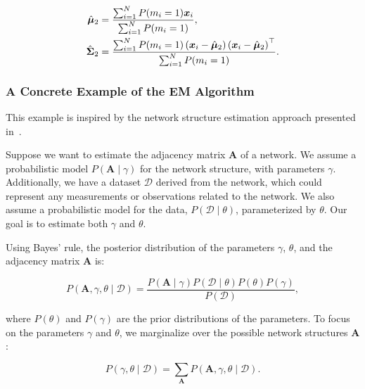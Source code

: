 {\begin{itemize}
    \begin{equation}
        \begin{aligned}
            \hat{\bm{\mu}}_2 & = \frac{\sum_{i=1}^{N}{P(m_i=1) \bm{x}_i}}{\sum_{i=1}^{N}{P(m_i=1)}},  \\
            \hat{\bm{\Sigma}}_2 & = \frac{\sum_{i=1}^{N}{P(m_i=1)\left( \bm{x}_i -  \hat{\bm{\mu}}_2  \right)\left( \bm{x}_i -  \hat{\bm{\mu}}_2  \right)^\top}}{\sum_{i=1}^{N}{P(m_i=1)}}.
        \end{aligned}
    \end{equation}
\end{itemize}

        
\subsubsection{A Concrete Example of the EM Algorithm}

This example is inspired by the network structure estimation approach presented in~\citet{newman2018estimating}. 

Suppose we want to estimate the adjacency matrix \(\bm{A}\) of a network. We assume a probabilistic model \(P(\bm{A} \mid \gamma)\) for the network structure, with parameters \(\gamma\). Additionally, we have a dataset \(\mathcal{D}\) derived from the network, which could represent any measurements or observations related to the network. We also assume a probabilistic model for the data, \(P(\mathcal{D} \mid \theta)\), parameterized by \(\theta\). Our goal is to estimate both \(\gamma\) and \(\theta\).

Using Bayes' rule, the posterior distribution of the parameters \(\gamma\), \(\theta\), and the adjacency matrix \(\bm{A}\) is:

\begin{equation}
    P(\bm{A}, \gamma, \theta \mid \mathcal{D}) =  \frac{P(\bm{A} \mid \gamma) P(\mathcal{D} \mid \theta) P(\theta) P(\gamma)}{P(\mathcal{D})},
\end{equation}

where \(P(\theta)\) and \(P(\gamma)\) are the prior distributions of the parameters. To focus on the parameters \(\gamma\) and \(\theta\), we marginalize over the possible network structures \(\bm{A}\):

\begin{equation}
    P(\gamma, \theta \mid \mathcal{D}) = \sum_{\bm{A}}{P(\bm{A}, \gamma, \theta \mid \mathcal{D})}.
\end{equation}

}
